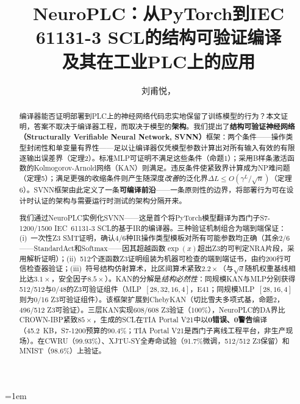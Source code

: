 \documentclass[journal,onecolumn]{IEEEtran}
\newcommand{\neuroplc}{NeuroPLC\xspace}
\theoremstyle{definition}
\theoremstyle{plain}
\theoremstyle{remark}
\begin{document}
\title{NeuroPLC：从PyTorch到IEC 61131-3 SCL的结构可验证编译\\ 及其在工业PLC上的应用}

\author{刘甫悦，}


\maketitle

\raggedbottom
\emergencystretch=1em

\begin{abstract}
编译器能否证明部署到PLC上的神经网络代码忠实地保留了训练模型的行为？本文证明，答案不取决于编译器工程，而取决于模型的\textbf{架构}。我们提出了\textbf{结构可验证神经网络（Structurally Verifiable Neural Network, SVNN）}框架：两个条件——操作类型封闭性和单变量有界性——足以让编译器仅凭模型参数计算出对所有输入有效的有限逐输出误差界（定理2）。标准MLP可证明不满足这些条件（命题1）；采用B样条激活函数的Kolmogorov-Arnold网络（KAN）则满足。违反条件使紧致界计算成为NP难问题（定理5）；满足更强的收缩条件则产生随深度\textit{改善}的泛化界$\Delta L \leq O(\gamma^L/\sqrt{n})$（定理6）。SVNN框架由此定义了一条\textbf{可编译前沿}——一条原则性的边界，将部署行为可在设计时认证的架构与需要运行时测试的架构分隔开来。

我们通过\neuroplc{}实例化SVNN——这是首个将PyTorch模型翻译为西门子S7-1200/1500 IEC~61131-3 SCL的基于IR的编译器。三种验证机制组合为端到端保证：(i)~一次性Z3 SMT证明，确认4/6种IR操作类型模板对所有可能参数均正确（其余2/6——StandardAct和Softmax——因其超越函数$\exp(x)$超出Z3的可判定NRA片段，采用解析证明）；(ii)~512个逐函数Z3证明组装为机器可检查的端到端证书，由约200行可信检查器验证；(iii)~符号结构仿射算术，比区间算术紧致$2.2\times$（与$\sqrt{d}$随机权重基线相比达$3.1\times$，安全因子$8.5\times$）。KAN的分解是\textit{结构必然性}：同规模KAN与MLP分别获得512/512与0/48的Z3可验证组件（MLP~$[28,32,16,4]$，E41；同规模MLP~$[28,16,4]$则为0/16 Z3可验证组件）。该框架扩展到ChebyKAN（切比雪夫多项式基，命题2，496/512 Z3可验证）。三层KAN实现608/608 Z3验证（100\%），NeuroPLC的DA界比CROWN-IBP紧致$85\times$，生成的SCL在TIA Portal V21中以\textbf{0错误、0警告}编译（45.2~KB，S7-1200预算的90.4\%；TIA Portal V21是西门子离线工程平台，非生产现场）。在CWRU（99.93\%）、XJTU-SY全寿命试验（91.7\%微调，512/512 Z3保留）和MNIST（98.6\%）上验证。
\end{abstract}
\end{document}
